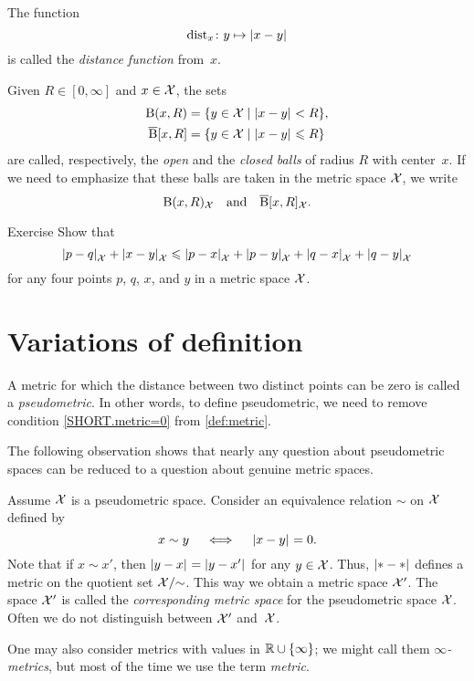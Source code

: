 The function 
\[\distfun_x\:y\mapsto \dist{x}{y}{}\]
is called the \emph{distance function} from~$x$. 

Given $R\in[0,\infty]$ and $x\in \mathcal{X}$, the sets
\begin{align*}
\oBall(x,R)&=\{y\in \spc{X}\mid \dist{x}{y}{}<R\},
\\
\cBall[x,R]&=\{y\in \spc{X}\mid \dist{x}{y}{}\le R\}
\end{align*}
are called, respectively, the  \emph{open} and  the \emph{closed  balls}   of radius $R$ with center~$x$.
If we need to emphasize that these balls are taken in the metric space $\mathcal{X}$,
we write 
\[\mathrm{B}{}(x,R)_{\mathcal{X}}\quad\text{and}\quad\overline{\mathrm{B}}{}[x,R]_{\mathcal{X}}.\]

\begin{thm}{Exercise}\label{ex:quad-inq}
Show that
\[\dist{p}{q}{\spc{X}}+\dist{x}{y}{\spc{X}}\le\dist{p}{x}{\spc{X}}+\dist{p}{y}{\spc{X}}+\dist{q}{x}{\spc{X}}+\dist{q}{y}{\spc{X}}\]
for any four points $p$, $q$, $x$, and $y$ in a metric space $\mathcal{X}$.
\end{thm}

\section{Variations of definition}

A metric for which the distance between two distinct points can be zero is called a \emph{pseudometric}.
In other words, to define pseudometric, we need to remove condition \ref{SHORT.metric=0} from \ref{def:metric}.

The following observation shows that
nearly any question about pseudometric spaces can be reduced to a question about genuine metric spaces.

Assume $\mathcal{X}$ is a pseudometric space.
Consider an equivalence relation $\sim$ on $\mathcal{X}$ defined by
\[x\sim y\quad\iff\quad\dist{x}{y}{}=0.\] 
Note that if $x\sim x'$, then $\dist{y}{x}{}=\dist{y}{x'}{}$ for any $y\in\mathcal{X}$.
Thus, $\dist{*}{*}{}$ defines a metric on the
quotient set $\mathcal{X}/{\sim}$.
This way we obtain a metric space $\mathcal{X}'$.
The space $\mathcal{X}'$ is called the 
\emph{corresponding metric space} for the pseudometric space $\mathcal{X}$.
Often we do not distinguish between $\mathcal{X}'$ and~$\mathcal{X}$. 

One may also consider metrics with values in $\mathbb{R}\cup\{\infty\}$;
we might call them \emph{$\infty$-metrics}, but most of the time we use the term {}\emph{metric}.

